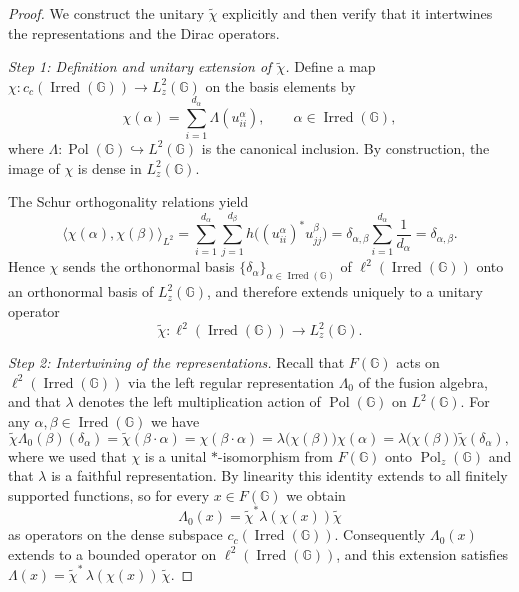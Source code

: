 \documentclass[12pt, reqno]{amsart}
\theoremstyle{definition}
\theoremstyle{remark}
\numberwithin{equation}{section}
\begin{document}
\begin{proof}
We construct the unitary $\tilde{\chi}$ explicitly and then verify that it 
intertwines the representations and the Dirac operators.

\emph{Step 1: Definition and unitary extension of $\tilde{\chi}$.}  
Define a map $\chi : c_c(\operatorname{Irred}(\mathbb{G})) \to L^2_z(\mathbb{G})$ 
on the basis elements by
\[
\chi(\alpha) = \sum_{i=1}^{d_\alpha} \Lambda(u_{ii}^\alpha),\qquad 
\alpha\in\operatorname{Irred}(\mathbb{G}),
\]
where $\Lambda:\operatorname{Pol}(\mathbb{G})\hookrightarrow L^2(\mathbb{G})$ is 
the canonical inclusion. By construction, the image of $\chi$ is dense in 
$L^2_z(\mathbb{G})$.

The Schur orthogonality relations \cite[Proposition~5.3.8~(iii)]{15} yield
\[
\langle \chi(\alpha),\chi(\beta) \rangle_{L^2}
   = \sum_{i=1}^{d_\alpha}\sum_{j=1}^{d_\beta} h\bigl((u_{ii}^\alpha)^* u_{jj}^\beta\bigr)
   = \delta_{\alpha,\beta}\sum_{i=1}^{d_\alpha} \frac{1}{d_\alpha}
   = \delta_{\alpha,\beta}.
\]
Hence $\chi$ sends the orthonormal basis $\{\delta_\alpha\}_{\alpha\in\operatorname{Irred}(\mathbb{G})}$ 
of $\ell^2(\operatorname{Irred}(\mathbb{G}))$ onto an orthonormal basis of 
$L^2_z(\mathbb{G})$, and therefore extends uniquely to a unitary operator
\[
\tilde{\chi}: \ell^2(\operatorname{Irred}(\mathbb{G})) \longrightarrow L^2_z(\mathbb{G}).
\]

\emph{Step 2: Intertwining of the representations.}  
Recall that $F(\mathbb{G})$ acts on $\ell^2(\operatorname{Irred}(\mathbb{G}))$ via 
the left regular representation $\Lambda_0$ of the fusion algebra, and that $\lambda$ 
denotes the left multiplication action of $\operatorname{Pol}(\mathbb{G})$ on 
$L^2(\mathbb{G})$. For any $\alpha,\beta\in\operatorname{Irred}(\mathbb{G})$ we have
\[
\tilde{\chi}\Lambda_0(\beta)(\delta_\alpha)
   = \tilde{\chi}(\beta\cdot\alpha)
   = \chi(\beta\cdot\alpha)
   = \lambda\bigl(\chi(\beta)\bigr)\chi(\alpha)
   = \lambda\bigl(\chi(\beta)\bigr)\tilde{\chi}(\delta_\alpha),
\]
where we used that $\chi$ is a unital $*$-isomorphism from $F(\mathbb{G})$ onto 
$\operatorname{Pol}_z(\mathbb{G})$ and that $\lambda$ is a faithful representation. 
By linearity this identity extends to all finitely supported functions, so for 
every $x\in F(\mathbb{G})$ we obtain
\[
\Lambda_0(x) = \tilde{\chi}^* \lambda(\chi(x)) \tilde{\chi}
\]
as operators on the dense subspace $c_c(\operatorname{Irred}(\mathbb{G}))$. 
Consequently $\Lambda_0(x)$ extends to a bounded operator on 
$\ell^2(\operatorname{Irred}(\mathbb{G}))$, and this extension satisfies 
$\Lambda(x)=\tilde{\chi}^*\,\lambda(\chi(x))\,\tilde{\chi}$.


\end{proof}
\end{document}
